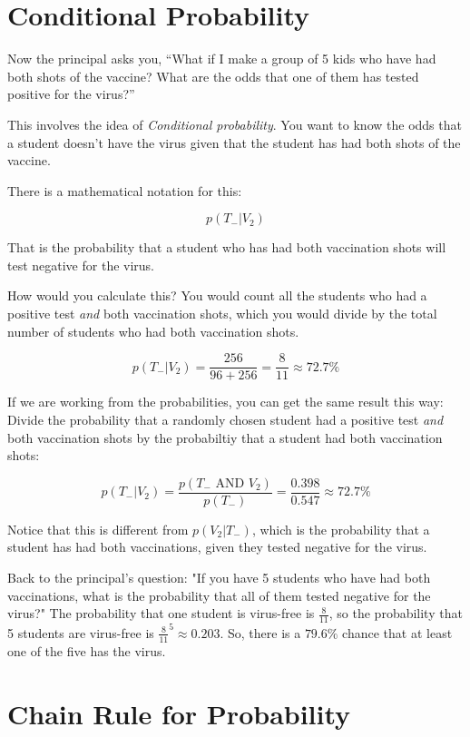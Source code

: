 \section{Conditional Probability}

Now the principal asks you, ``What if I make a group of 5 kids who
have had both shots of the vaccine? What are the odds that one of them
has tested positive for the virus?''

This involves the idea of \textit{Conditional probability}.  You want
to know the odds that a student doesn't have the virus given that
the student has had both shots of the vaccine.

There is a mathematical notation for this:

$$p(T_{-} | V_{2})$$

That is the probability that a student who has had both vaccination
shots will test negative for the virus.

How would you calculate this? You would count all the students who had
a positive test \textit{and} both vaccination shots, which you would
divide by the total number of students who had both vaccination shots.

$$p(T_{-} | V_{2}) = \frac{256}{96 + 256} = \frac{8}{11} \approx 72.7\%$$

If we are working from the probabilities, you can get the same result
this way: Divide the probability that a randomly chosen student had a
positive test \textit{and} both vaccination shots by the probabiltiy
that a student had both vaccination shots:

$$p(T_{-} | V_{2}) = \frac{p(T_{-} \text{ AND } V_{2})}{p(T_{-})} =  \frac{0.398}{0.547} \approx 72.7\%$$

Notice that this is different from $p( V_{2} | T_{-})$, which is the
probability that a student has had both vaccinations, given they
tested negative for the virus.

Back to the principal's question: "If you have 5 students who have had
both vaccinations, what is the probability that all of them tested
negative for the virus?" The probability that one student is virus-free
is $\frac{8}{11}$, so the probability that 5 students are virus-free
is $\frac{8}{11}^5 \approx 0.203$.  So, there is a $79.6\%$ chance
that at least one of the five has the virus.

\section{Chain Rule for Probability}

